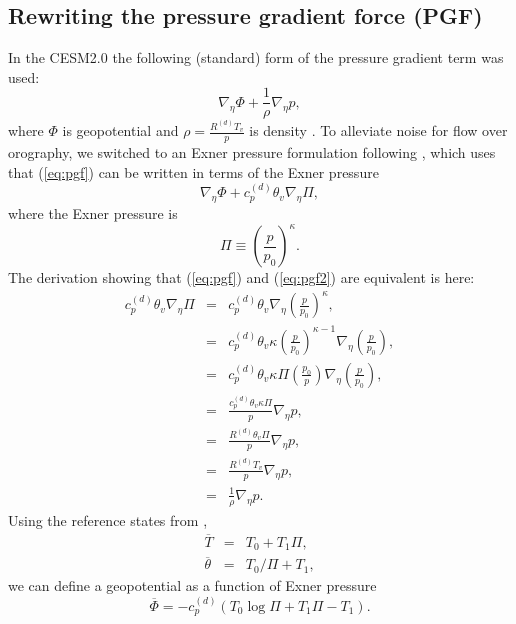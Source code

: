 \documentclass[draft]{agujournal2019}
\begin{document}
\subsection{Rewriting the pressure gradient force (PGF)}
In the CESM2.0 the following (standard) form of the pressure gradient term was used:
\begin{equation}
\label{eq:pgf}
    \nabla_{\eta }\Phi+\frac{1}{\rho}\nabla_{\eta }p,
\end{equation}
where $\Phi$ is geopotential and $\rho=\frac{R^{(d)}T_v}{p}$ is density \cite<for details see >{LetAl2018JAMES}. To alleviate noise for flow over orography, 
 we switched to an Exner pressure formulation following , which uses that (\ref{eq:pgf}) can be written in terms of the Exner pressure
\begin{equation}\label{eq:pgf2}
    \nabla_{\eta }\Phi+c_p^{(d)}\theta_v\nabla_{\eta }\Pi,
\end{equation}
where the Exner pressure is
\begin{equation}
    \Pi\equiv \left( \frac{p}{p_0}\right)^{\kappa}.
\end{equation}
The derivation showing that (\ref{eq:pgf}) and (\ref{eq:pgf2}) are equivalent is {\color{blue}{given}} here:
\begin{eqnarray*}
c_p^{(d)}\theta_v\nabla_{\eta }\Pi &=& c_p^{(d)}\theta_v\nabla_{\eta }\left( \frac{p}{p_0}\right)^{\kappa},\\
&=& c_p^{(d)}\theta_v\kappa\left( \frac{p}{p_0}\right)^{\kappa-1} \nabla_{\eta }\left( \frac{p}{p_0}\right),\\
&=& c_p^{(d)}\theta_v\kappa\Pi\left( \frac{p_0}{p}\right) \nabla_{\eta }\left(\frac{p}{p_0}\right),\\
&=& \frac{c_p^{(d)}\theta_v\kappa\Pi}{p} \nabla_{\eta }p,\\
&=& \frac{R^{(d)}\theta_v\Pi}{p} \nabla_{\eta }p,\\
&=& \frac{R^{(d)}T_v}{p} \nabla_{\eta }p,\\
&=& \frac{1}{\rho} \nabla_{\eta }p.
\end{eqnarray*}
Using the reference states from \cite{SJ1991QJRMS},
\begin{eqnarray}
  \overline{T}&=&T_0+T_1 \Pi,\\
  \overline{\theta}&=&{T_0}/\Pi+T_1,
\end{eqnarray}
we can define a geopotential as a function of Exner pressure
\begin{equation}
    \overline{\Phi} = -c_p^{(d)}\left( T_0\log \Pi+T_1\Pi-T_1\right). 
\end{equation}
\end{document}
